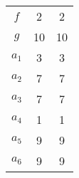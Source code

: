 \begin{center}
\begin{minipage}[t]{.4\linewidth}
\begin{longtable}[c]{| c | c | c|}
     $f$ & 2 & 2\\
     $g$ & 10 & 10\\
     $a_1$ & 3 & 3\\
     $a_2$ & 7 & 7\\
     $a_3$ & 7 & 7\\
     $a_4$ & 1 & 1\\
     $a_5$ & 9 & 9\\
     $a_6$ & 9 & 9\\
     \hline
\end{longtable}
\end{minipage}
\end{center}

